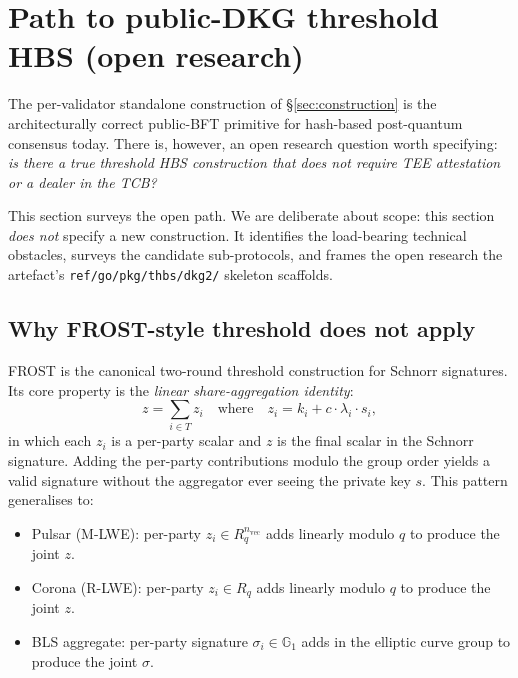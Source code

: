 \section{Path to public-DKG threshold HBS (open research)}
\label{sec:fullmpc}

The per-validator standalone construction of \S\ref{sec:construction}
is the architecturally correct public-BFT primitive for hash-based
post-quantum consensus today. There is, however, an open research
question worth specifying: \emph{is there a true threshold HBS
construction that does not require TEE attestation or a dealer in
the TCB?}

This section surveys the open path. We are deliberate about scope:
this section \emph{does not} specify a new construction. It
identifies the load-bearing technical obstacles, surveys the
candidate sub-protocols, and frames the open research the artefact's
\texttt{ref/go/pkg/thbs/dkg2/} skeleton scaffolds.

\subsection{Why FROST-style threshold does not apply}
\label{sec:fullmpc:no-komlo}

FROST \cite{frost,rfc9591} is the canonical two-round threshold
construction for Schnorr signatures. Its core property is the
\emph{linear share-aggregation identity}:
\begin{equation}
  z = \sum_{i \in T} z_i \quad \text{where} \quad z_i = k_i + c \cdot \lambda_i \cdot s_i,
\end{equation}
in which each $z_i$ is a per-party scalar and $z$ is the final scalar
in the Schnorr signature. Adding the per-party contributions modulo
the group order yields a valid signature without the aggregator ever
seeing the private key $s$. This pattern generalises to:
\begin{itemize}[nosep,leftmargin=2em]
  \item Pulsar (M-LWE): per-party $z_i \in R_q^{n_{\mathrm{vec}}}$
        adds linearly modulo $q$ to produce the joint $z$.
  \item Corona (R-LWE): per-party $z_i \in R_q$ adds linearly
        modulo $q$ to produce the joint $z$.
  \item BLS aggregate: per-party signature $\sigma_i \in \mathbb{G}_1$
        adds in the elliptic curve group to produce the joint
        $\sigma$.
\end{itemize}

